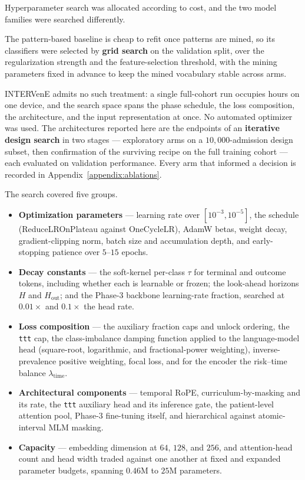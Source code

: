 Hyperparameter search was allocated according to cost, and the two model families were searched differently.

The pattern-based baseline is cheap to refit once patterns are mined, so its classifiers were selected by \textbf{grid search} on the validation split, over the regularization strength and the feature-selection threshold, with the mining parameters fixed in advance to keep the mined vocabulary stable across arms.

INTERVenE admits no such treatment: a single full-cohort run occupies hours on one device, and the search space spans the phase schedule, the loss composition, the architecture, and the input representation at once. No automated optimizer was used. The architectures reported here are the endpoints of an \textbf{iterative design search} in two stages --- exploratory arms on a $10{,}000$-admission design subset, then confirmation of the surviving recipe on the full training cohort --- each evaluated on validation performance. Every arm that informed a decision is recorded in Appendix~\ref{appendix:ablations}.

The search covered five groups.

\begin{itemize}
\item \textbf{Optimization parameters} --- learning rate over $[10^{-3}, 10^{-5}]$, the schedule (ReduceLROnPlateau against OneCycleLR), AdamW betas, weight decay, gradient-clipping norm, batch size and accumulation depth, and early-stopping patience over $5$--$15$ epochs.
\item \textbf{Decay constants} --- the soft-kernel per-class $\tau$ for terminal and outcome tokens, including whether each is learnable or frozen; the look-ahead horizons $H$ and $H_{\text{out}}$; and the Phase-3 backbone learning-rate fraction, searched at $0.01\times$ and $0.1\times$ the head rate.
\item \textbf{Loss composition} --- the auxiliary fraction caps and unlock ordering, the \texttt{ttt} cap, the class-imbalance damping function applied to the language-model head (square-root, logarithmic, and fractional-power weighting), inverse-prevalence positive weighting, focal loss, and for the encoder the risk--time balance $\lambda_{\text{time}}$.
\item \textbf{Architectural components} --- temporal RoPE, curriculum-by-masking and its rate, the \texttt{ttt} auxiliary head and its inference gate, the patient-level attention pool, Phase-3 fine-tuning itself, and hierarchical against atomic-interval MLM masking.
\item \textbf{Capacity} --- embedding dimension at $64$, $128$, and $256$, and attention-head count and head width traded against one another at fixed and expanded parameter budgets, spanning $0.46$M to $25$M parameters.
\end{itemize}

